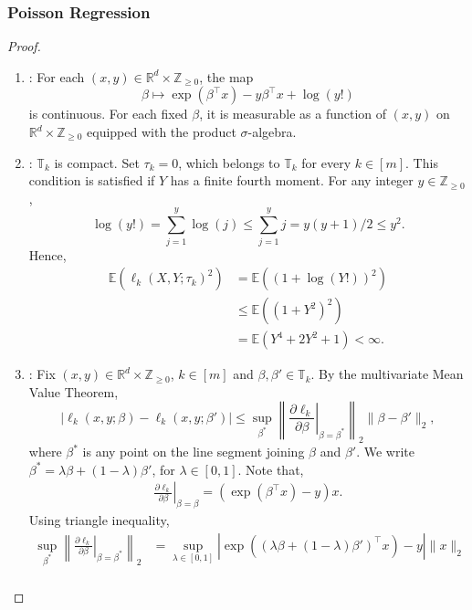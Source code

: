 \documentclass[12pt]{article}
\newcommand{\blue}[1]{\textcolor[rgb]{0.00,0.00,1.00}{#1}}
\theoremstyle{remark}
\theoremstyle{plain}
\begin{document}
\subsubsection{Poisson Regression}
\begin{proof}
    \begin{enumerate}
    \item[A1]: For each $(x,y)\in\mathbb R^d\times\mathbb Z_{\ge0}$, the map
    \[
    \beta\mapsto \exp(\beta^\top x)-y\beta^\top x+\log(y!)
    \]
    is continuous. For each fixed $\beta$, it is measurable as a function of $(x,y)$ on $\mathbb R^d\times\mathbb Z_{\ge0}$ equipped with the product $\sigma$-algebra.
    \item[A2]: $\mathbb{T}_k$ is compact. Set $\tau_k=0$, which belongs to $\mathbb{T}_k$ for every $k\in[m]$. This condition is satisfied if $Y$ has a finite fourth moment. For any integer $y\in\mathbb{Z}_{\geq 0}$,
    \[
        \log(y!) = \sum_{j=1}^y \log(j) \leq \sum_{j=1}^y j = y(y+1)/2 \leq y^2.
    \]
    Hence,
    \begin{align*}
        \mathbb{E}\left(\ell_k(X, Y; \tau_k)^2\right) &= \mathbb{E}\left(\left(1+\log(Y!)\right)^2\right)\\
        &\leq \mathbb{E}\left(\left(1+ Y^2\right)^2\right)\\
        &= \mathbb{E}\left(Y^4 + 2Y^2 + 1\right) < \infty.
    \end{align*}
    \item[A3]: Fix \blue{$(x,y)\in \mathbb R^d\times\mathbb Z_{\ge0}$}, $k \in \left[m\right]$ and $\beta, \beta'\in \mathbb{T}_k$. By the multivariate Mean Value Theorem,
    \[|\ell_k(x, y; \beta) - \ell_k(x, y; \beta')| \leq \sup_{\beta^*} \left\lVert \left. \frac{\partial \ell_k}{\partial \beta}\right|_{\beta = \beta^*} \right \rVert_2 \lVert \beta - \beta'\rVert_2,\]
    where $\beta^*$ is any point on the line segment joining $\beta$ and $\beta'$. We write $\beta^* = \lambda\beta + (1 - \lambda)\beta'$, for $\lambda\in\left[0, 1\right]$. Note that,
    \begin{align*}
        \left.\frac{\partial \ell_k}{\partial \beta}\right|_{\beta=\beta} = \left(\exp( \beta^\top x) - y\right)x.
    \end{align*}
    Using triangle inequality,
    \begin{align*}
        \sup_{\beta^*} \left\lVert \left. \frac{\partial \ell_k}{\partial \beta}\right|_{\beta = \beta^*} \right \rVert_2 &= \sup_{\lambda\in\left[0, 1\right]}\left| \exp\left((\lambda\beta + (1 - \lambda)\beta')^\top x\right) - y\right| \lVert x\rVert_2\\

\end{align*}
\end{enumerate}
\end{proof}
\end{document}
